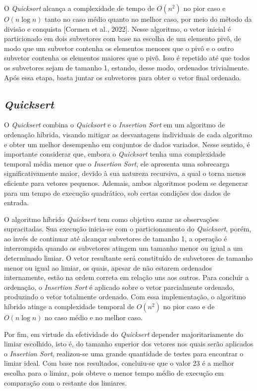 \documentclass[12pt]{article}
\begin{document}
O \textit{Quicksort} alcança a complexidade de tempo de $O(n^2)$ no pior caso e $O(n\log{n})$ tanto no caso médio quanto no melhor caso, por meio do método da divisão e conquista [Cormen et al., 2022]. Nesse algoritmo, o vetor inicial é particionado em dois subvetores com base na escolha de um elemento pivô, de modo que um subvetor contenha os elementos menores que o pivô e o outro subvetor contenha os elementos maiores que o pivô. Isso é repetido até que todos os subvetores sejam de tamanho 1, estando, desse modo, ordenados trivialmente. Após essa etapa, basta juntar os subvetores para obter o vetor final ordenado.

\subsection{\textit{Quicksert}}  \label{sec:firstpage}

O \textit{Quicksert} combina o \textit{Quicksort} e o \textit{Insertion Sort} em um algoritmo de ordenação híbrida, visando mitigar as desvantagens individuais de cada algoritmo e obter um melhor desempenho em conjuntos de dados variados. Nesse sentido, é importante considerar que, embora o \textit{Quicksort} tenha uma complexidade temporal média menor que o \textit{Insertion Sort}, ele apresenta uma sobrecarga significativamente maior, devido à sua natureza recursiva, a qual o torna menos eficiente para vetores pequenos. Ademais, ambos algoritmos podem se degenerar para um tempo de execução quadrático, sob certas condições dos dados de entrada.

O algoritmo híbrido \textit{Quicksert} tem como objetivo sanar as observações supracitadas. Sua execução inicia-se com o particionamento do \textit{Quicksort}, porém, ao invés de continuar até alcançar subvetores de tamanho 1, a operação é interrompida quando os subvetores atingem um tamanho menor ou igual a um determinado limiar. O vetor resultante será constituído de subvetores de tamanho menor ou igual ao limiar, os quais, apesar de não estarem ordenados internamente, estão na ordem correta em relação uns aos outros. Para concluir a ordenação, o \textit{Insertion Sort} é aplicado sobre o vetor parcialmente ordenado, produzindo o vetor totalmente ordenado. Com essa implementação, o algoritmo híbrido atinge a complexidade temporal de $O(n^2)$ no pior caso e de $O(n\log{n})$ no caso médio e no melhor caso.

Por fim, em virtude da efetividade do \textit{Quicksert} depender majoritariamente do limiar escolhido, isto é, do tamanho superior dos vetores nos quais serão aplicados o \textit{Insertion Sort}, realizou-se uma grande quantidade de testes para encontrar o limiar ideal. Com base nos resultados, concluiu-se que o valor 23 é a melhor escolha para o limiar, pois obteve o menor tempo médio de execução em comparação com o restante dos limiares.
\end{document}
